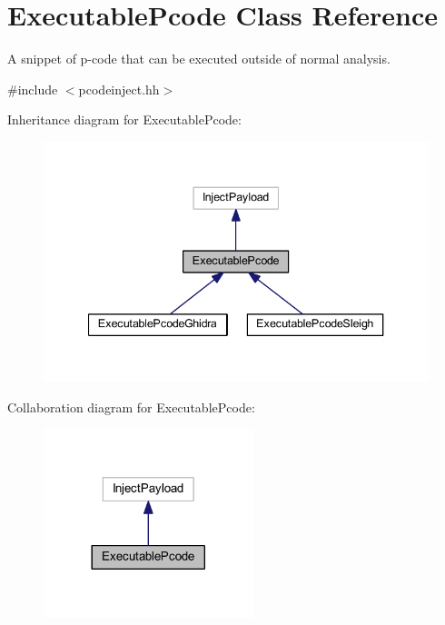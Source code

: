 \hypertarget{class_executable_pcode}{}\section{Executable\+Pcode Class Reference}
\label{class_executable_pcode}


A snippet of p-\/code that can be executed outside of normal analysis.  




{\ttfamily \#include $<$pcodeinject.\+hh$>$}



Inheritance diagram for Executable\+Pcode\+:
\nopagebreak
\begin{figure}[H]
\begin{center}
\leavevmode
\includegraphics[width=340pt]{class_executable_pcode__inherit__graph}
\end{center}
\end{figure}


Collaboration diagram for Executable\+Pcode\+:
\nopagebreak
\begin{figure}[H]
\begin{center}
\leavevmode
\includegraphics[width=173pt]{class_executable_pcode__coll__graph}
\end{center}
\end{figure}
